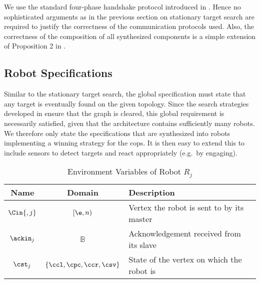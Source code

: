 We use the standard four-phase handshake protocol introduced in . Hence no sophisticated arguments as in the previous section on stationary target search are required to justify the correctness of the communication protocols used. Also, the correctness of the composition of all synthesized components is a simple extension of Proposition 2 in .\\

\subsection{Robot Specifications} \label{sec:robspec}

Similar to the stationary target search, the global specification must state that any target is eventually found on the given topology. Since the search strategies developed in  ensure that the graph is cleared, this global requirement is necessarily satisfied, given that the architecture contains sufficiently many robots. We therefore only state the specifications that are synthesized into robots implementing a winning strategy for the cops. It is then easy to extend this to include sensors to detect targets and react appropriately (e.g.\ by engaging).\\

\begin{table}
\centering
\begin{tabular}{c|c|l}
\hline
Name & Domain & Description \\
\hline
$\Cin{,j}$ & $[\e, n)$ & Vertex the robot is sent to by its master \\
$\ackin_j$ & $\mathbb{B}$ & Acknowledgement received from its slave \\
$\cst_j$ & $\{\ccl, \cpc, \ccr, \csv\}$ & State of the vertex on which the robot is \\
\hline
\end{tabular}
\caption{Environment Variables of Robot $R_j$}
\label{tab:inp:robot}
\end{table}

